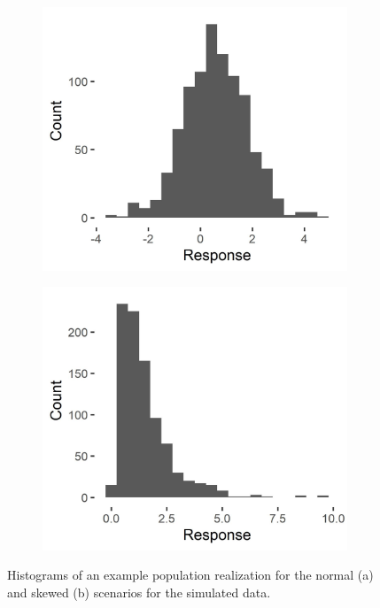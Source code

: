 \documentclass[]{elsarticle} %
\begin{document}
\begin{figure}
\centering
\begin{subfigure}{0.49\textwidth}
  \centering
  \includegraphics[width = 1\linewidth]{figures/symm_pop_hist.jpeg}
  \caption{}
  \label{fig:symm_pop_hist}
\end{subfigure}
\begin{subfigure}{0.49\textwidth}
  \centering
  \includegraphics[width = 1\linewidth]{figures/skew_pop_hist.jpeg}
  \caption{}
  \label{fig:skew_pop_hist}
\end{subfigure}
\caption{Histograms of an example population realization for the normal (a) and skewed (b) scenarios for the simulated data.}
\label{fig:sim_pops}
\end{figure}
\end{document}
